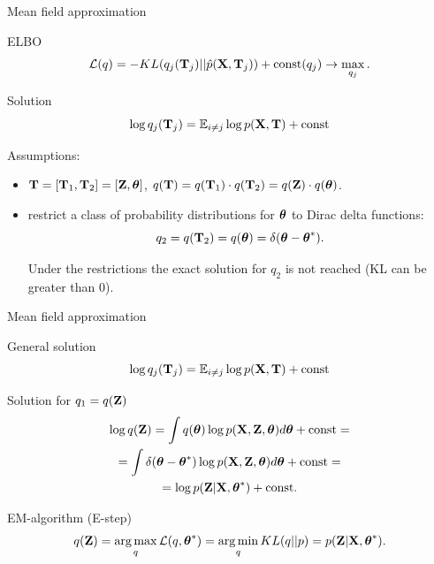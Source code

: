 \begin{frame}{Mean field approximation}
	\begin{block}{ELBO}
		\[
			\mathcal{L} (q) = - KL (q_j(\mathbf{T}_j) || \hat{p}(\mathbf{X}, \mathbf{T}_j))  + \text{const}(q_j) \rightarrow \max_{q_j}.
		\]
		\vspace{-0.3cm}
	\end{block}
	\begin{block}{Solution}
		\vspace{-0.3cm}
		\[
			\log q_j(\mathbf{T}_j) = \mathbb{E}_{i \neq j} \log p(\mathbf{X}, \mathbf{T}) + \text{const}
		\]
		\vspace{-0.3cm}
	\end{block}
	Assumptions: 
	\begin{itemize}
		\item $\mathbf{T} = [\mathbf{T}_1, \mathbf{T}_2] = [\mathbf{Z}, \boldsymbol{\theta}]$, $q(\mathbf{T}) = q(\mathbf{T}_1) \cdot q(\mathbf{T}_2) = q(\mathbf{Z}) \cdot q(\boldsymbol{\theta})$.
		\item restrict a class of probability distributions for $\boldsymbol{\theta}$ to Dirac delta functions:
		\[
			q_2 = q(\mathbf{T}_2) = q(\boldsymbol{\theta}) = \delta(\boldsymbol{\theta} - \boldsymbol{\theta}^*).
		\]
		
		Under the restrictions the exact solution for $q_2$ is not reached (KL can be greater than 0).
	\end{itemize}
\end{frame}
\begin{frame}{Mean field approximation}
	\begin{block}{General solution}
		\vspace{-0.3cm}
		\[
		\log q_j(\mathbf{T}_j) = \mathbb{E}_{i \neq j} \log p(\mathbf{X}, \mathbf{T}) + \text{const}
		\]
		\vspace{-0.3cm}
	\end{block}
	\begin{block}{Solution for $q_1 = q(\mathbf{Z})$}
		\vspace{-0.3cm}
		\begin{multline*}
			\log q(\mathbf{Z}) = \int q(\boldsymbol{\theta}) \log p(\mathbf{X}, \mathbf{Z},  \boldsymbol{\theta}) d\boldsymbol{\theta} + \text{const} = \\
			= \int \delta(\boldsymbol{\theta} - \boldsymbol{\theta}^*) \log p(\mathbf{X}, \mathbf{Z},  \boldsymbol{\theta}) d\boldsymbol{\theta} + \text{const} = \\
			= \log p (\mathbf{Z} | \mathbf{X}, \boldsymbol{\theta}^*) +  \text{const}.
		\end{multline*}
	\end{block}
	\vspace{-0.3cm}
	\begin{block}{EM-algorithm (E-step)}
		\vspace{-0.3cm}
	\[
		q(\mathbf{Z}) = \operatorname*{arg\,max}_q \mathcal{L} (q, \boldsymbol{\theta}^*) = \operatorname*{arg\,min}_q KL(q || p) = p(\mathbf{Z}| \mathbf{X}, \boldsymbol{\theta}^*).
	\]
	\end{block}
\end{frame}
